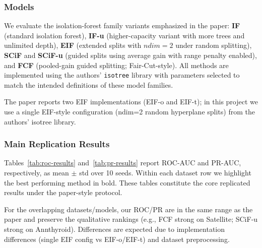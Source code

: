 \subsubsection{Models}
We evaluate the isolation-forest family variants emphasized in the paper:
\textbf{IF} (standard isolation forest), \textbf{IF-u} (higher-capacity variant with more trees and unlimited depth),
\textbf{EIF} (extended splits with $ndim=2$ under random splitting), \textbf{SCiF} and \textbf{SCiF-u} (guided splits using average gain with range penalty enabled),
and \textbf{FCF} (pooled-gain guided splitting; Fair-Cut-style).
All methods are implemented using the authors' \texttt{isotree} library with parameters selected to match the intended definitions of these model families.

The paper reports two EIF implementations (EIF-o and EIF-t); in this project we use a single EIF-style configuration (ndim=2 random hyperplane splits) from the authors’ isotree library.

\subsubsection{Main Replication Results}
Tables~\ref{tab:roc-results} and~\ref{tab:pr-results} report ROC-AUC and PR-AUC, respectively, as mean $\pm$ std over 10 seeds.
Within each dataset row we highlight the best performing method in bold. These tables constitute the core replicated results under the paper-style protocol.

For the overlapping datasets/models, our ROC/PR are in the same range as the paper and preserve the qualitative rankings (e.g., FCF strong on Satellite; SCiF-u strong on Annthyroid). Differences are expected due to implementation differences (single EIF config vs EIF-o/EIF-t) and dataset preprocessing.

